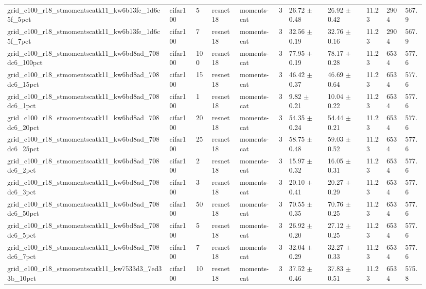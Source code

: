 \begin{tabular}{lllllllllll}
grid_c100_r18_stmomentscatk11_kw6b13fe_1d6c5f_5pct & cifar100 & 5 & resnet18 & moments-cat & 3 & 26.72 $\pm$ 0.48 & 26.92 $\pm$ 0.42 & 11.23 & 2904 & 567.9 \\
grid_c100_r18_stmomentscatk11_kw6b13fe_1d6c5f_7pct & cifar100 & 7 & resnet18 & moments-cat & 3 & 32.56 $\pm$ 0.19 & 32.76 $\pm$ 0.16 & 11.23 & 2904 & 567.9 \\
grid_c100_r18_stmomentscatk11_kw6bd8ad_708dc6_100pct & cifar100 & 100 & resnet18 & moments-cat & 3 & 77.95 $\pm$ 0.19 & 78.17 $\pm$ 0.28 & 11.23 & 6534 & 577.6 \\
grid_c100_r18_stmomentscatk11_kw6bd8ad_708dc6_15pct & cifar100 & 15 & resnet18 & moments-cat & 3 & 46.42 $\pm$ 0.37 & 46.69 $\pm$ 0.64 & 11.23 & 6534 & 577.6 \\
grid_c100_r18_stmomentscatk11_kw6bd8ad_708dc6_1pct & cifar100 & 1 & resnet18 & moments-cat & 3 & 9.82 $\pm$ 0.21 & 10.04 $\pm$ 0.22 & 11.23 & 6534 & 577.6 \\
grid_c100_r18_stmomentscatk11_kw6bd8ad_708dc6_20pct & cifar100 & 20 & resnet18 & moments-cat & 3 & 54.35 $\pm$ 0.24 & 54.44 $\pm$ 0.21 & 11.23 & 6534 & 577.6 \\
grid_c100_r18_stmomentscatk11_kw6bd8ad_708dc6_25pct & cifar100 & 25 & resnet18 & moments-cat & 3 & 58.75 $\pm$ 0.48 & 59.03 $\pm$ 0.52 & 11.23 & 6534 & 577.6 \\
grid_c100_r18_stmomentscatk11_kw6bd8ad_708dc6_2pct & cifar100 & 2 & resnet18 & moments-cat & 3 & 15.97 $\pm$ 0.32 & 16.05 $\pm$ 0.31 & 11.23 & 6534 & 577.6 \\
grid_c100_r18_stmomentscatk11_kw6bd8ad_708dc6_3pct & cifar100 & 3 & resnet18 & moments-cat & 3 & 20.10 $\pm$ 0.41 & 20.27 $\pm$ 0.29 & 11.23 & 6534 & 577.6 \\
grid_c100_r18_stmomentscatk11_kw6bd8ad_708dc6_50pct & cifar100 & 50 & resnet18 & moments-cat & 3 & 70.55 $\pm$ 0.35 & 70.76 $\pm$ 0.25 & 11.23 & 6534 & 577.6 \\
grid_c100_r18_stmomentscatk11_kw6bd8ad_708dc6_5pct & cifar100 & 5 & resnet18 & moments-cat & 3 & 26.92 $\pm$ 0.20 & 27.12 $\pm$ 0.25 & 11.23 & 6534 & 577.6 \\
grid_c100_r18_stmomentscatk11_kw6bd8ad_708dc6_7pct & cifar100 & 7 & resnet18 & moments-cat & 3 & 32.04 $\pm$ 0.29 & 32.27 $\pm$ 0.33 & 11.23 & 6534 & 577.6 \\
grid_c100_r18_stmomentscatk11_kw7533d3_7ed33b_10pct & cifar100 & 10 & resnet18 & moments-cat & 3 & 37.52 $\pm$ 0.46 & 37.83 $\pm$ 0.51 & 11.23 & 6534 & 575.8 \\

\end{tabular}
